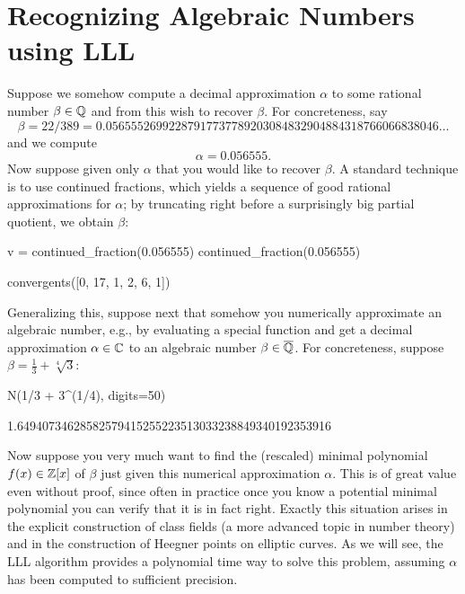 \section{Recognizing Algebraic Numbers using LLL}\label{sec:LLL}

Suppose we somehow compute a decimal approximation $\alpha$
to some rational number $\beta \in \mathbb{Q}$ and from this wish
to recover $\beta$.  For concreteness, say
$$\beta= 22/389 = 0.05655526992287917737789203084832904884318766066838046\ldots$$
and we compute
$$
  \alpha = 0.056555.
$$
Now suppose given only $\alpha$ that you would like to recover
$\beta$.  A standard technique is to use continued fractions, which
yields a sequence of good rational approximations
for $\alpha$; by truncating right before a surprisingly big
partial quotient, we obtain $\beta$:
\begin{sagecode}
\begin{sagecell}
v = continued_fraction(0.056555)
continued_fraction(0.056555)
\end{sagecell}
\begin{sageout}
[0, 17, 1, 2, 6, 1, 23, 1, 1, 1, 1, 1, 2]
\end{sageout}
\begin{sagecell}
convergents([0, 17, 1, 2, 6, 1])
\end{sagecell}
\begin{sageout}
[0, 1/17, 1/18, 3/53, 19/336, 22/389]
\end{sageout}
\end{sagecode}

   
Generalizing this, suppose next that somehow you numerically approximate
an algebraic number, e.g., by evaluating a special
function and get a decimal approximation $\alpha \in \mathbb{C}$
to an algebraic number $\beta \in \overline{\mathbb{Q}}$.  For concreteness,
suppose $\beta = \frac{1}{3} + \sqrt[4]{3}$:
\begin{sagecode}
\begin{sagecell}
N(1/3 + 3^(1/4), digits=50)
\end{sagecell}
\begin{sageout}
1.64940734628582579415255223513033238849340192353916
\end{sageout}
\end{sagecode}
Now suppose you very much want to find the (rescaled) 
minimal polynomial $f(x) \in \mathbb{Z}[x]$
of $\beta$ just given this numerical approximation $\alpha$.
This is of great value even without proof, since often in practice
once you know a potential minimal polynomial you can
verify that it is in fact right.  Exactly this situation
arises in the explicit construction of class fields (a
more advanced topic in number theory) and in the construction
of Heegner points on elliptic curves.   As we will see, the
LLL algorithm provides a polynomial time way to solve this
problem, assuming $\alpha$ has been computed to
sufficient precision. 

